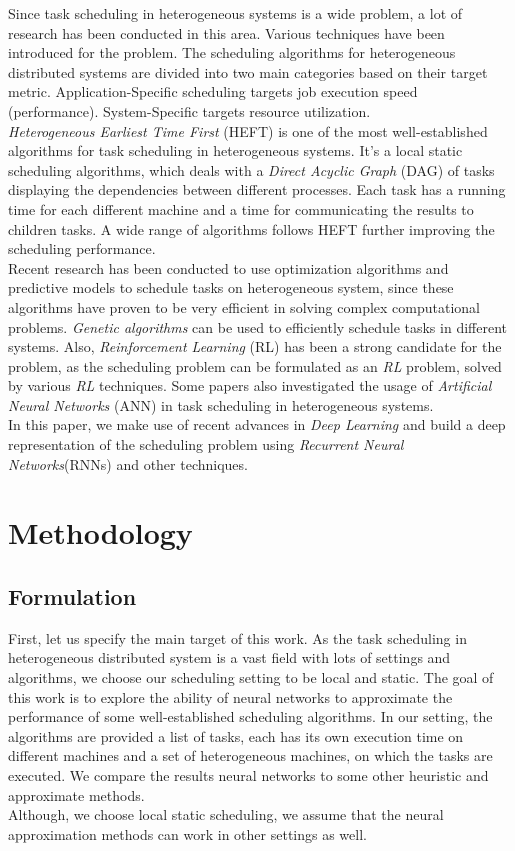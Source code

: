 \documentclass[twocolumn,11pt]{IEEEtran}
\begin{document}
Since task scheduling in heterogeneous systems is a wide problem, a lot of research has been conducted in this area. Various techniques have been introduced for the problem. 
The scheduling algorithms for heterogeneous distributed systems are divided into two main categories based on their target metric. Application-Specific scheduling targets job execution speed (performance). System-Specific targets resource utilization. \\
\emph{Heterogeneous Earliest Time First} (HEFT)\cite{993206} is one of the most well-established algorithms for task scheduling in heterogeneous systems. 
It's a local static scheduling algorithms, which deals with a \emph{Direct Acyclic Graph} (DAG) of tasks displaying the dependencies between different processes. Each task has a running time for each different machine and a time for communicating the results to children tasks. 
A wide range of algorithms\cite{inbook} follows HEFT further improving the scheduling performance. \\
Recent research has been conducted to use optimization algorithms and predictive models to schedule tasks on heterogeneous system, since these algorithms have proven to be very efficient in solving complex computational problems. 
\emph{Genetic algorithms}\cite{article2} can be used to efficiently schedule tasks in different systems. Also, \emph{Reinforcement Learning} (RL)\cite{ORHEAN2018292} has been a strong candidate for the problem, as the scheduling problem can be formulated as an \emph{RL} problem, solved by various \emph{RL} techniques. 
Some papers also investigated the usage of \emph{Artificial Neural Networks} (ANN)\cite{article3} in task scheduling in heterogeneous systems. \\ 
In this paper, we make use of recent advances in \emph{Deep Learning} and build a deep representation of the scheduling problem using \emph{Recurrent Neural Networks}(RNNs)\cite{chung2014empirical} and other techniques.

\section{Methodology}

\subsection{Formulation}
First, let us specify the main target of this work. As the task scheduling in heterogeneous distributed system is a vast field with lots of settings and algorithms\cite{inbook}, we choose our scheduling setting to be local and static. The goal of this work is to explore the ability of neural networks to approximate the performance of some well-established scheduling algorithms. In our setting, the algorithms are provided a list of tasks, each has its own execution time on different machines and a set of heterogeneous machines, on which the tasks are executed. We compare the results neural networks to some other heuristic and approximate methods. \\
Although, we choose local static scheduling, we assume that the neural approximation methods can work in other settings as well.
\end{document}

